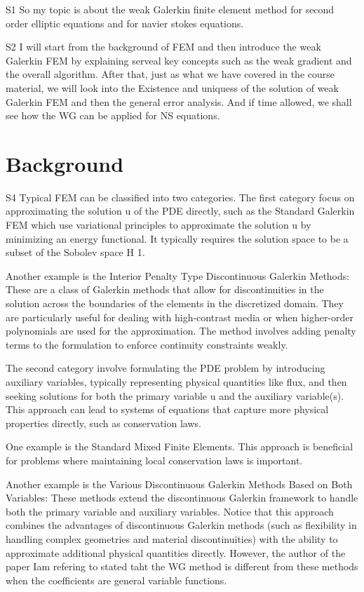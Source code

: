 \documentclass[17pt]{extarticle} %
\begin{document}
\setlength{\parskip}{1em} 
\setlength{\parindent}{0pt}
S1
So my topic is about the weak Galerkin finite element method for second order elliptic
equations and for navier stokes equations.

S2
I will start from the background of FEM and then introduce the weak Galerkin FEM by explaining 
serveal key concepts such as the weak gradient and the overall algorithm. After that, just as what we have 
covered in the course material, we will look into the Existence and uniquess of the solution of weak
Galerkin FEM and then the general error analysis. And if time allowed, we shall see how the WG can be 
applied for NS equations.

\section*{Background}
S4
Typical FEM can be classified into two categories. The first category focus on approximating the 
solution u of the PDE directly, such as the Standard Galerkin FEM which 
use variational principles to approximate the solution u by minimizing an energy functional.
It typically requires the solution space to be a subset of the Sobolev space H 1.

Another example is the Interior Penalty Type Discontinuous Galerkin Methods: These are a class of Galerkin methods that allow 
for discontinuities in the solution across the boundaries of the elements in the discretized domain. 
They are particularly useful for dealing with high-contrast media or when higher-order polynomials 
are used for the approximation. The method involves adding penalty terms to the formulation to 
enforce continuity constraints weakly.

The second category involve formulating the PDE problem by introducing auxiliary variables, 
typically representing physical quantities like flux, and then seeking solutions for
both the primary variable u and the auxiliary variable(s). This approach can lead to 
systems of equations that capture more physical properties directly, such as conservation 
laws.

One example is the Standard Mixed Finite Elements. This approach 
is beneficial for problems where maintaining local conservation laws is important. 

Another example is the Various Discontinuous Galerkin Methods Based on Both Variables: These methods extend 
the discontinuous Galerkin framework to handle both the primary variable and auxiliary 
variables. Notice that this approach combines the advantages of discontinuous Galerkin 
methods (such as flexibility in handling complex geometries and material discontinuities) 
with the ability to approximate additional physical quantities directly. However, 
the author of the paper Iam refering to stated taht the WG method is different from these methods when the coefficients are general variable functions.
\end{document}
